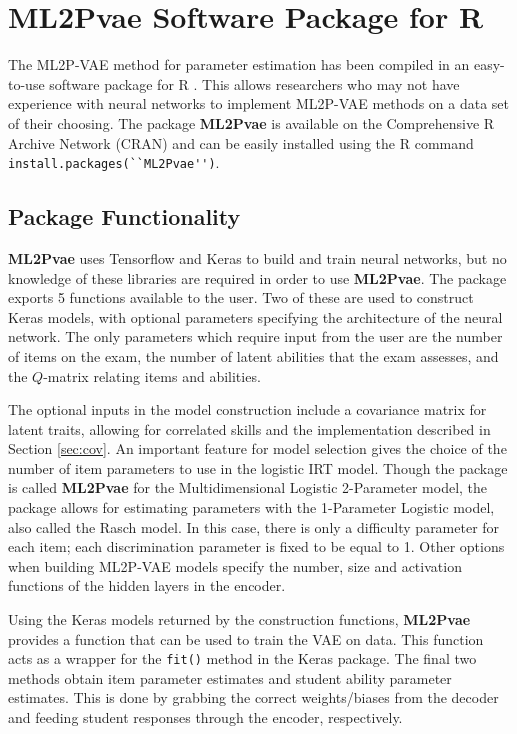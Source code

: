 \section{\textbf{ML2Pvae} Software Package for R}
The ML2P-VAE method for parameter estimation has been compiled in an easy-to-use software package for R \cite{r_package}. This allows researchers who may not have experience with neural networks to implement ML2P-VAE methods on a data set of their choosing. The package \textbf{ML2Pvae} is available on the Comprehensive R Archive Network (CRAN) and can be easily installed using the R command \verb!install.packages(``ML2Pvae'')!. 

\subsection{Package Functionality}
\textbf{ML2Pvae} uses Tensorflow and Keras to build and train neural networks, but no knowledge of these libraries are required in order to use \textbf{ML2Pvae}. The package exports 5 functions available to the user. Two of these are used to construct Keras models, with optional parameters specifying the architecture of the neural network. The only parameters which require input from the user are the number of items on the exam, the number of latent abilities that the exam assesses, and the $Q$-matrix relating items and abilities.

The optional inputs in the model construction include a covariance matrix for latent traits, allowing for correlated skills and the implementation described in Section \ref{sec:cov}. An important feature for model selection gives the choice of the number of item parameters to use in the logistic IRT model. Though the package is called \textbf{ML2Pvae} for the Multidimensional Logistic 2-Parameter model, the package allows for estimating parameters with the 1-Parameter Logistic model, also called the Rasch model. In this case, there is only a difficulty parameter for each item; each  discrimination parameter is fixed to be equal to 1. Other options when building ML2P-VAE models specify the number, size and activation functions of the hidden layers in the encoder.

Using the Keras models returned by the construction functions, \textbf{ML2Pvae} provides a function that can be used to train the VAE on data. This function acts as a wrapper for the \verb!fit()! method in the Keras package. The final two methods obtain item parameter estimates and student ability parameter estimates. This is done by grabbing the correct weights/biases from the decoder and feeding student responses through the encoder, respectively. 

